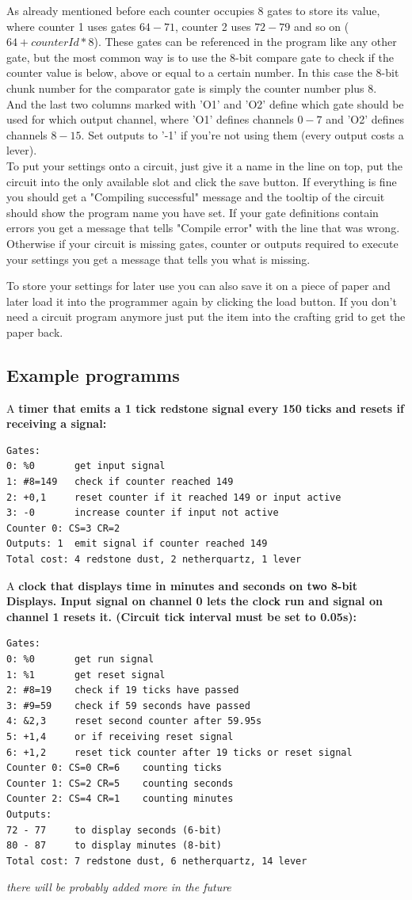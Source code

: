 \documentclass[11pt]{article} %
\begin{document}
As already mentioned before each counter occupies 8 gates to store its value, where counter 1 uses gates $64-71$, counter 2 uses $72-79$ and so on ($64 + counterId * 8$). These gates can be referenced in the program like any other gate, but the most common way is to use the 8-bit compare gate to check if the counter value is below, above or equal to a certain number. In this case the 8-bit chunk number for the comparator gate is simply the counter  number plus 8.\\

And the last two columns marked with 'O1' and 'O2' define which gate should be used for which output channel, where 'O1' defines channels $0-7$ and 'O2' defines channels $8-15$. Set outputs to '-1' if you're not using them (every output costs a lever).\\

To put your settings onto a circuit, just give it a name in the line on top, put the circuit into the only available slot and click the save button. If everything is fine you should get a "Compiling successful" message and the tooltip of the circuit should show the program name you have set. If your gate definitions contain errors you get a message that tells "Compile error" with the line that was wrong. Otherwise if your circuit is missing gates, counter or outputs required to execute your settings you get a message that tells you what is missing.

To store your settings for later use you can also save it on a piece of paper and later load it into the programmer again by clicking the load button. If you don't need a circuit program anymore just put the item into the crafting grid to get the paper back.

\subsection{Example programms}
A \bf timer \rm that emits a 1 tick redstone signal every 150 ticks and resets if receiving a signal:
\begin{lstlisting}
Gates:
0: %0		get input signal
1: #8=149	check if counter reached 149
2: +0,1		reset counter if it reached 149 or input active
3: -0		increase counter if input not active
Counter 0: CS=3 CR=2
Outputs: 1	emit signal if counter reached 149
Total cost: 4 redstone dust, 2 netherquartz, 1 lever
\end{lstlisting}
A \bf clock \rm that displays time in minutes and seconds on two 8-bit Displays. Input signal on channel 0 lets the clock run and signal on channel 1 resets it. (Circuit tick interval must be set to 0.05s):
\begin{lstlisting}
Gates:
0: %0		get run signal
1: %1		get reset signal
2: #8=19	check if 19 ticks have passed
3: #9=59	check if 59 seconds have passed
4: &2,3		reset second counter after 59.95s
5: +1,4		or if receiving reset signal
6: +1,2		reset tick counter after 19 ticks or reset signal
Counter 0: CS=0 CR=6	counting ticks
Counter 1: CS=2 CR=5	counting seconds
Counter 2: CS=4 CR=1	counting minutes
Outputs: 
72 - 77		to display seconds (6-bit)
80 - 87		to display minutes (8-bit)
Total cost: 7 redstone dust, 6 netherquartz, 14 lever
\end{lstlisting}

\it there will be probably added more in the future \rm
\end{document}
